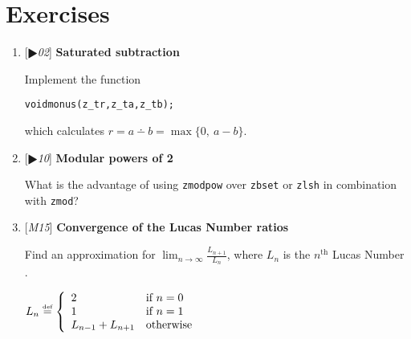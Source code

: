 \chapter{Exercises}
\label{chap:Exercises}

% 
% 
% 
% 


\begin{enumerate}[label=\textbf{\arabic*}.]



\item {[$\RHD$\textit{02}]} \textbf{Saturated subtraction}

Implement the function

\vspace{-1em}
\begin{alltt}
   void monus(z_t r, z_t a, z_t b);
\end{alltt}
\vspace{-1em}

\noindent
which calculates $r = a \dotminus b = \max \{ 0,~ a - b \}$.



\item {[$\RHD$\textit{10}]} \textbf{Modular powers of 2}

What is the advantage of using \texttt{zmodpow}
over \texttt{zbset} or \texttt{zlsh} in combination
with \texttt{zmod}?



\item {[\textit{M15}]} \textbf{Convergence of the Lucas Number ratios}

Find an approximation for
$\displaystyle{ \lim_{n \to \infty} \frac{L_{n + 1}}{L_n}}$,
where $L_n$ is the $n^{\text{th}}$
Lucas Number .

\( \displaystyle{
    L_n \stackrel{\text{\tiny{def}}}{\text{=}} \left \{ \begin{array}{ll}
      2 & \text{if} ~ n = 0 \\
      1 & \text{if} ~ n = 1 \\
      L_{n - 1} + L_{n + 1} & \text{otherwise}
    \end{array} \right .
}\)




\end{enumerate}
